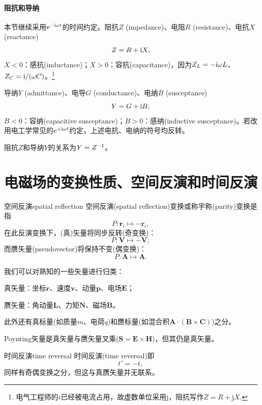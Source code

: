 \paragraph{阻抗和导纳}
本节继续采用$\mathop{}\!\mathrm{e}^{-\mathrm{i}\omega t}$的时间约定。阻抗$Z$ (impedance)、电阻$R$ (resistance)、电抗$X$ (reactance)
\[
    Z = R + \mathrm{i} X,
\]
$X < 0$：感抗(inductance)；$X > 0$：容抗(capacitance)，因为$Z_L = -\mathrm{i}\omega L$、$Z_C = \mathrm{i}/(\omega C)$。\footnote{电气工程师的$i$已经被电流占用，故虚数单位采用j，阻抗写作$Z = R + \mathrm j X.$}

导纳$Y$ (admittance)、电导$G$ (conductance)、电纳$B$ (susceptance)
\[
    Y = G + \mathrm{i} B,
\]
$B < 0$：容纳(capacitive susceptance)；$B > 0$：感纳(inductive susceptance)。若改用电工学常见的$\mathop{}\!\mathrm{e}^{+\mathrm{i}\omega t}$约定，上述电抗、电纳的符号均反转。

阻抗$Z$和导纳$Y$的关系为$Y = Z^{-1}$。
\section{电磁场的变换性质、空间反演和时间反演}
\begin{definition}{空间反演}{spatial reflection}
    空间反演(spatial reflection)变换或称宇称(parity)变换是指
    \[
        P:\bm r_i \mapsto -\bm r_i,
    \]
    在此反演变换下，(真)矢量将同步反转(奇变换)：
    \[
        P:\bm V \mapsto -\bm V;
    \]
    而赝矢量(pseudovector)将保持不变(偶变换)：
    \[
        P:\bm A \mapsto \bm A.
    \]
\end{definition}

\begin{corollary}
    我们可以对熟知的一些矢量进行归类：
    \begin{compactitem}
    	\item 真矢量：坐标$\bm r$、速度$\bm v$、动量$\bm p$、电场$\bm E$；
    	\item 赝矢量：角动量$\bm L$、力矩$\bm N$、磁场$\bm B$。
    \end{compactitem}
    此外还有真标量(如质量$m$、电荷$q$)和赝标量(如混合积$\bm A \cdot (\bm B \times \bm C)$)之分。
\end{corollary}

\begin{remark}
    Poynting矢量是真矢量与赝矢量叉乘($\bm S = \bm E \times \bm H$)，但其仍是真矢量。
\end{remark}

\begin{definition}{时间反演}{time reversal}
    时间反演(time reversal)即
    \[
        t' = -t,
    \]
    同样有奇偶变换之分，但这与真赝矢量并无联系。
\end{definition}

